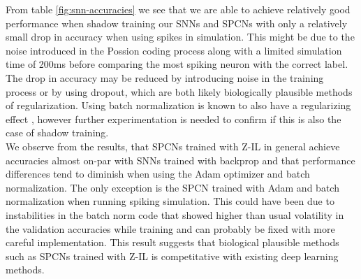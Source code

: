 \documentclass[a4paper,11pt]{article} %
\begin{document}
From table \ref{fig:snn-accuracies} we see that we are able to achieve relatively good performance when shadow training our SNNs and SPCNs with only a relatively small drop in accuracy when using spikes in simulation. This might be due to the noise introduced in the Possion coding process along with a limited simulation time of 200ms before comparing the most spiking neuron with the correct label. The drop in accuracy may be reduced by introducing noise in the training process or by using dropout, which are both likely biologically plausible methods of regularization. Using batch normalization is known to also have a regularizing effect \cite{ioffe2015batch}, however further experimentation is needed to confirm if this is also the case of shadow training. \\
We observe from the results, that SPCNs trained with Z-IL in general achieve accuracies almost on-par with SNNs trained with backprop and that performance differences tend to diminish when using the Adam optimizer and batch normalization. The only exception is the SPCN trained with Adam and batch normalization when running spiking simulation. This could have been due to instabilities in the batch norm code that showed higher than usual volatility in the validation accuracies while training and can probably be fixed with more careful implementation. This result suggests that biological plausible methods such as SPCNs trained with Z-IL is competitative with existing deep learning methods. 

\newpage
\end{document}
